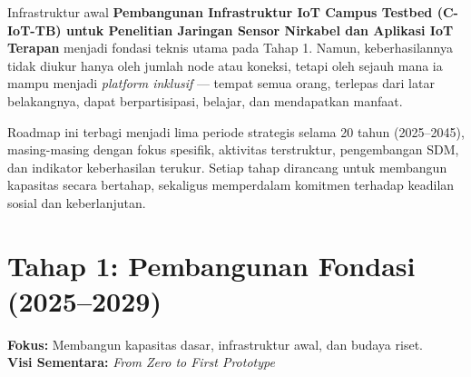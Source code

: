 \documentclass[11pt,a4paper]{article}
\begin{document}
Infrastruktur awal \textbf{Pembangunan Infrastruktur IoT Campus Testbed (C-IoT-TB) untuk Penelitian Jaringan Sensor Nirkabel dan Aplikasi IoT Terapan} menjadi fondasi teknis utama pada Tahap 1. Namun, keberhasilannya tidak diukur hanya oleh jumlah node atau koneksi, tetapi oleh sejauh mana ia mampu menjadi \textit{platform inklusif} — tempat semua orang, terlepas dari latar belakangnya, dapat berpartisipasi, belajar, dan mendapatkan manfaat.

Roadmap ini terbagi menjadi lima periode strategis selama 20 tahun (2025–2045), masing-masing dengan fokus spesifik, aktivitas terstruktur, pengembangan SDM, dan indikator keberhasilan terukur. Setiap tahap dirancang untuk membangun kapasitas secara bertahap, sekaligus memperdalam komitmen terhadap keadilan sosial dan keberlanjutan.

\section{Tahap 1: Pembangunan Fondasi (2025–2029)}
\label{sec:tahap1}

\textbf{Fokus:} Membangun kapasitas dasar, infrastruktur awal, dan budaya riset.\\
\textbf{Visi Sementara:} \textit{From Zero to First Prototype}
\end{document}
